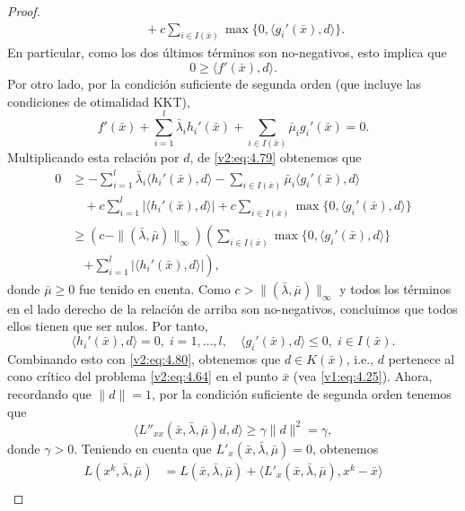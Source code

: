 \begin{proof}
\begin{align}
        &\quad + c \sum_{i \in I(\bar{x})} \max\{0, \langle g_i'(\bar{x}), d \rangle\}.
        \label{v2:eq:4.79}
    \end{align}
    En particular, como los dos últimos términos son no-negativos, esto implica que
    \begin{equation}
        0 \ge \langle f'(\bar{x}), d \rangle.
        \label{v2:eq:4.80}
    \end{equation}
    Por otro lado, por la condición suficiente de segunda orden (que incluye las condiciones de otimalidad KKT),
    \[
        f'(\bar{x}) + \sum_{i=1}^l \bar{\lambda}_i h_i'(\bar{x}) + \sum_{i \in I(\bar{x})} \bar{\mu}_i g_i'(\bar{x}) = 0.
    \]
    Multiplicando esta relación por $d$, de \eqref{v2:eq:4.79} obtenemos que
    \begin{align*}
        0 &\ge -\sum_{i=1}^l \bar{\lambda}_i \langle h_i'(\bar{x}), d \rangle - \sum_{i \in I(\bar{x})} \bar{\mu}_i \langle g_i'(\bar{x}), d \rangle \\
        &\quad + c \sum_{i=1}^l |\langle h_i'(\bar{x}), d \rangle| + c \sum_{i \in I(\bar{x})} \max\{0, \langle g_i'(\bar{x}), d \rangle\} \\
        &\ge (c - \|(\bar{\lambda}, \bar{\mu})\|_\infty) \left( \sum_{i \in I(\bar{x})} \max\{0, \langle g_i'(\bar{x}), d \rangle\} \right. \\
        &\quad \left. + \sum_{i=1}^l |\langle h_i'(\bar{x}), d \rangle| \right),
    \end{align*}
    donde $\bar{\mu} \ge 0$ fue tenido en cuenta. Como $c > \|(\bar{\lambda}, \bar{\mu})\|_\infty$ y todos los términos en el lado derecho de la relación de arriba son no-negativos, concluimos que todos ellos tienen que ser nulos. Por tanto,
    \[
        \langle h_i'(\bar{x}), d \rangle = 0, \; i = 1, \dots, l, \quad \langle g_i'(\bar{x}), d \rangle \le 0, \; i \in I(\bar{x}).
    \]
    Combinando esto con \eqref{v2:eq:4.80}, obtenemos que $d \in K(\bar{x})$, i.e., $d$ pertenece al cono crítico del problema \eqref{v2:eq:4.64} en el punto $\bar{x}$ (vea \eqref{v1:eq:4.25}).
    Ahora, recordando que $\|d\| = 1$, por la condición suficiente de segunda orden tenemos que
    \[
        \langle L''_{xx}(\bar{x}, \bar{\lambda}, \bar{\mu})d, d \rangle \ge \gamma \|d\|^2 = \gamma,
    \]
    donde $\gamma > 0$.
    Teniendo en cuenta que $L'_x(\bar{x}, \bar{\lambda}, \bar{\mu}) = 0$, obtenemos
    \begin{align}
        L(x^k, \bar{\lambda}, \bar{\mu}) &= L(\bar{x}, \bar{\lambda}, \bar{\mu}) + \langle L'_x(\bar{x}, \bar{\lambda}, \bar{\mu}), x^k - \bar{x} \rangle \nonumber \\

\end{align}
\end{proof}

